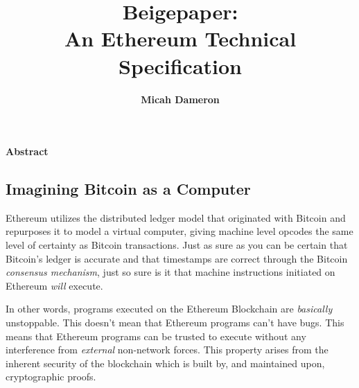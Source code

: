 \documentclass[10pt,a4paper,leqno,bibliography=totoc]{scrartcl}
\author{\large{\textbf{Micah Dameron}}}
\date{}
\title{\LARGE{Beigepaper: \\ An Ethereum Technical Specification}}
\makeatletter
\let\mcnewpage=\newpage
\newcommand{\TrickSupertabularIntoMulticols}{%
\renewcommand\newpage{%
	      \if@firstcolumn
	            \hrule width\linewidth height0pt
          \columnbreak
      \else
        \mcnewpage
       \fi
  }%
 }
\newenvironment{alphafootnotes}
{\par\edef\savedfootnotenumber{\number\value{footnote}}
\renewcommand{\thefootnote}{\alph{footnote}}
\setcounter{footnote}{0}}
{\par\setcounter{footnote}{\savedfootnotenumber}}
\makeatother
\begin{document}

	\begin{alphafootnotes}

	\pagecolor{beige}

	\maketitle

	\begin{center}\textbf{Abstract}\end{center}\par

	\begin{multicols*}{2}
	\TrickSupertabularIntoMulticols
	\begin{justify}
	
	
	\section{Imagining Bitcoin as a Computer}
		Ethereum utilizes the distributed ledger model that originated with Bitcoin and repurposes it to model a virtual computer, giving  machine level opcodes the same level of certainty as Bitcoin transactions. Just as sure as you can be certain that Bitcoin's ledger is accurate and that timestamps are correct through the Bitcoin \textit{consensus mechanism}, just so sure is it that machine instructions initiated on Ethereum \textit{will} execute.  	      
		
		
		In other words, programs executed on the Ethereum Blockchain are \textit{basically} unstoppable. This doesn't mean that Ethereum programs can't have bugs. This means that Ethereum programs can be trusted to execute without any interference from \textit{external} non-network forces. This property arises from the inherent security of the blockchain which is built by, and maintained upon, cryptographic proofs.


\end{justify}
\end{multicols*}
\end{alphafootnotes}
\end{document}
